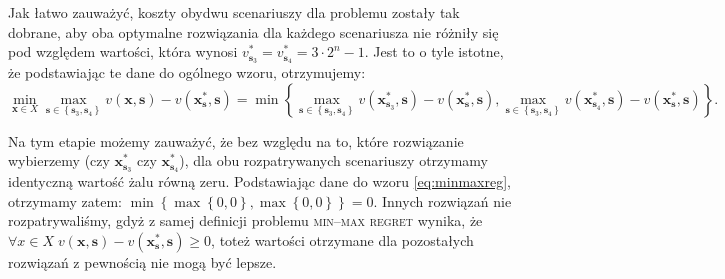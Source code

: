 Jak łatwo zauważyć, koszty obydwu scenariuszy dla problemu zostały tak dobrane, aby oba optymalne rozwiązania dla każdego scenariusza nie różniły się pod względem wartości, która wynosi $v^{\ast}_{\textbf{s}_{3}} = v^{\ast}_{\textbf{s}_{4}} = 3 \cdot 2^{n} - 1$. Jest to o tyle istotne, że podstawiając te dane do ogólnego wzoru, otrzymujemy:
\begin{equation}\label{eq:minmaxreg}
	\min_{\textbf{x} \in X} \max_{\textbf{s} \in \left\{ \textbf{s}_{3}, \textbf{s}_{4} \right\}} v \left( \textbf{x}, \textbf{s} \right) - v \left( \textbf{x}^{\ast}_{\textbf{s}}, \textbf{s} \right) = \min \left\{   \max_{\textbf{s} \in \left\{ \textbf{s}_{3}, \textbf{s}_{4} \right\}} v \left( \textbf{x}^{\ast}_{\textbf{s}_{3}}, \textbf{s} \right) - v \left( \textbf{x}^{\ast}_{\textbf{s}}, \textbf{s} \right), \max_{\textbf{s} \in \left\{ \textbf{s}_{3}, \textbf{s}_{4} \right\}} v \left( \textbf{x}^{\ast}_{\textbf{s}_{4}}, \textbf{s} \right) - v \left( \textbf{x}^{\ast}_{\textbf{s}}, \textbf{s} \right) \right\}\text{.}
\end{equation}

Na tym etapie możemy zauważyć, że bez względu na to, które rozwiązanie wybierzemy (czy $\textbf{x}^{\ast}_{\textbf{s}_{3}}$ czy $\textbf{x}^{\ast}_{\textbf{s}_{4}}$), dla obu rozpatrywanych scenariuszy otrzymamy identyczną wartość żalu równą zeru. Podstawiając dane do wzoru \ref{eq:minmaxreg}, otrzymamy zatem: $\min \left\{ \max \left\{ 0, 0 \right\} , \max \left\{ 0, 0 \right\} \right\} = 0$. Innych rozwiązań nie rozpatrywaliśmy, gdyż z samej definicji problemu \textsc{min--max regret} wynika, że $\forall x \in X \; v \left( \textbf{x}, \textbf{s} \right) - v \left( \textbf{x}^{\ast}_{\textbf{s}}, \textbf{s} \right) \geqslant 0$, toteż wartości otrzymane dla pozostałych rozwiązań z pewnością nie mogą być lepsze.

